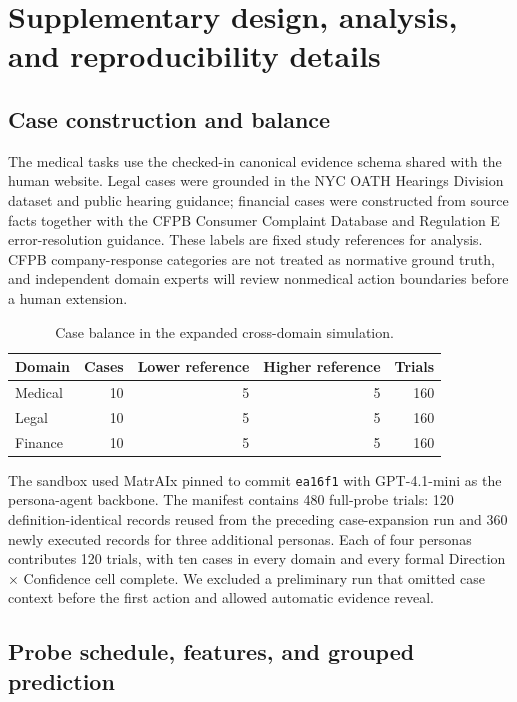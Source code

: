 \section{Supplementary design, analysis, and reproducibility details}
\label{app:supplement}

\subsection{Case construction and balance}

The medical tasks use the checked-in canonical evidence schema shared with the human website. Legal cases were grounded in the NYC OATH Hearings Division dataset and public hearing guidance; financial cases were constructed from source facts together with the CFPB Consumer Complaint Database and Regulation E error-resolution guidance. These labels are fixed study references for analysis. CFPB company-response categories are not treated as normative ground truth, and independent domain experts will review nonmedical action boundaries before a human extension.

\begin{table}[h]
\centering
\caption{Case balance in the expanded cross-domain simulation.}
\small
\begin{tabular}{lrrrr}
\toprule
Domain & Cases & Lower reference & Higher reference & Trials\\
\midrule
Medical & 10 & 5 & 5 & 160\\
Legal & 10 & 5 & 5 & 160\\
Finance & 10 & 5 & 5 & 160\\
\bottomrule
\end{tabular}
\end{table}

The sandbox used MatrAIx pinned to commit \texttt{ea16f1} with GPT-4.1-mini as the persona-agent backbone. The manifest contains 480 full-probe trials: 120 definition-identical records reused from the preceding case-expansion run and 360 newly executed records for three additional personas. Each of four personas contributes 120 trials, with ten cases in every domain and every formal Direction $\times$ Confidence cell complete. We excluded a preliminary run that omitted case context before the first action and allowed automatic evidence reveal.

\subsection{Probe schedule, features, and grouped prediction}

